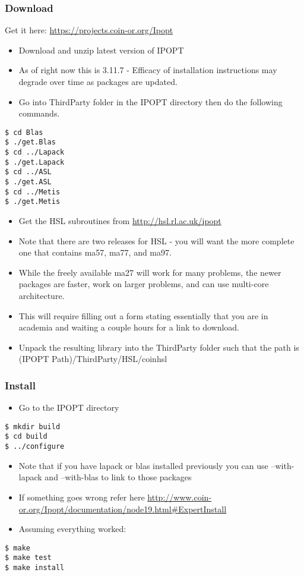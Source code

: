 \documentclass{scrartcl}
\newcommand{\bi}{\begin{itemize}}
\newcommand{\ei}{\end{itemize}}
\begin{document}
\subsubsection*{Download}
Get it here: \url{https://projects.coin-or.org/Ipopt}
\bi
\item Download and unzip latest version of IPOPT 
\item As of right now this is 3.11.7 - Efficacy of installation instructions may degrade over time as packages are updated.
\item Go into ThirdParty folder in the IPOPT directory then do the following commands.
\ei
\begin{verbatim}
$ cd Blas
$ ./get.Blas
$ cd ../Lapack
$ ./get.Lapack
$ cd ../ASL
$ ./get.ASL
$ cd ../Metis
$ ./get.Metis
\end{verbatim}
\bi
\item Get the HSL subroutines from \url{http://hsl.rl.ac.uk/ipopt}
\item Note that there are two releases for HSL - you will want the more complete one that contains ma57, ma77, and ma97. 
\item While the freely available ma27 will work for many problems, the newer packages are faster, work on larger problems, and can use multi-core architecture.
\item This will require filling out a form stating essentially that you are in academia and waiting a couple hours for a link to download.
\item Unpack the resulting library into the ThirdParty folder such that the path is (IPOPT Path)/ThirdParty/HSL/coinhsl
\ei

\subsubsection*{Install}
\bi
\item Go to the IPOPT directory
\ei
\begin{verbatim}
$ mkdir build
$ cd build
$ ../configure
\end{verbatim}
\bi
\item Note that if you have lapack or blas installed previously you can use --with-lapack and --with-blas to link to those packages
\item If something goes wrong refer here \url{http://www.coin-or.org/Ipopt/documentation/node19.html#ExpertInstall}
\item Assuming everything worked:
\ei
\begin{verbatim}
$ make
$ make test
$ make install
\end{verbatim}
\end{document}
